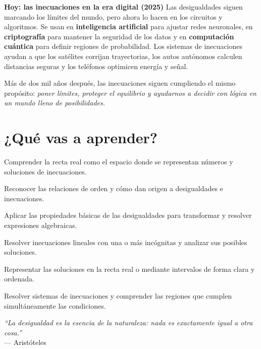 \begin{reseñaplana}
\textbf{Hoy: las inecuaciones en la era digital (2025)}  
Las desigualdades siguen marcando los límites del mundo, pero ahora lo hacen en los circuitos y algoritmos.  
Se usan en \textbf{inteligencia artificial} para ajustar redes neuronales, en \textbf{criptografía} para mantener la seguridad 
de los datos y en \textbf{computación cuántica} para definir regiones de probabilidad.  
Los sistemas de inecuaciones ayudan a que los satélites corrijan trayectorias, los autos autónomos calculen distancias 
seguras y los teléfonos optimicen energía y señal.

Más de dos mil años después, las inecuaciones siguen cumpliendo el mismo propósito:  
\textit{poner límites, proteger el equilibrio y ayudarnos a decidir con lógica en un mundo lleno de posibilidades.}
\end{reseñaplana}

\section*{¿Qué vas a aprender?}
\begin{aprende}
  \item Comprender la recta real como el espacio donde se representan números y soluciones de inecuaciones.  
  \item Reconocer las relaciones de orden y cómo dan origen a desigualdades e inecuaciones.  
  \item Aplicar las propiedades básicas de las desigualdades para transformar y resolver expresiones algebraicas.  
  \item Resolver inecuaciones lineales con una o más incógnitas y analizar sus posibles soluciones.  
  \item Representar las soluciones en la recta real o mediante intervalos de forma clara y ordenada.  
  \item Resolver sistemas de inecuaciones y comprender las regiones que cumplen simultáneamente las condiciones.  
\end{aprende}

\vspace{1cm}
\begin{flushright}
  {\oneptup\itshape ``La desigualdad es la esencia de la naturaleza: nada es exactamente igual a otra cosa.''}\\
  {\oneptup — Aristóteles}
\end{flushright}

